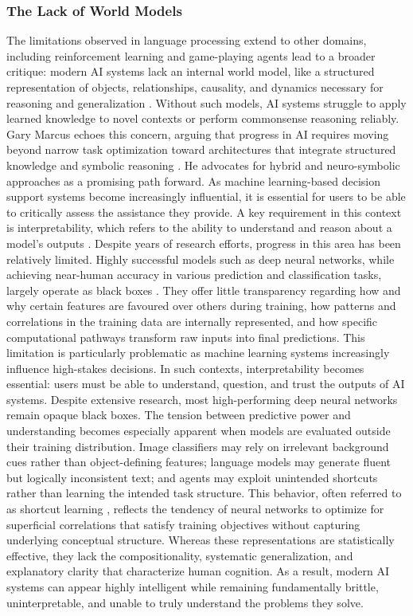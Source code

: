 \documentclass[12pt,a4paper]{report}
\begin{document}
\subsubsection{The Lack of World Models}
The limitations observed in language processing extend to other domains, including reinforcement learning and game-playing agents lead to a broader critique: modern AI systems lack an internal world model, like a structured representation of objects, relationships, causality, and dynamics necessary for reasoning and generalization \cite{chiave47} . Without such models, AI systems struggle to apply learned knowledge to novel contexts or perform commonsense reasoning reliably. Gary Marcus echoes this concern, arguing that progress in AI requires moving beyond narrow task optimization toward architectures that integrate structured knowledge and symbolic reasoning \cite{chiave42} . He advocates for hybrid and neuro-symbolic approaches as a promising path forward.
As machine learning-based decision support systems become increasingly influential, it is essential for users to be able to critically assess the assistance they provide. A key requirement in this context is interpretability, which refers to the ability to understand and reason about a model's outputs \cite{chiave25}. Despite years of research efforts, progress in this area has been relatively limited. Highly successful models such as deep neural networks, while achieving near-human accuracy in various prediction and classification tasks, largely operate as black boxes \cite{chiave7}. They offer little transparency regarding how and why certain features are favoured over others during training, how patterns and correlations in the training data are internally represented, and how specific computational pathways transform raw inputs into final predictions.
This limitation is particularly problematic as machine learning systems increasingly influence high-stakes decisions. In such contexts, interpretability becomes essential: users must be able to understand, question, and trust the outputs of AI systems. Despite extensive research, most high-performing deep neural networks remain opaque black boxes. 
The tension between predictive power and understanding becomes especially apparent when models are evaluated outside their training distribution. Image classifiers may rely on irrelevant background cues rather than object-defining features; language models may generate fluent but logically inconsistent text; and agents may exploit unintended shortcuts rather than learning the intended task structure. This behavior, often referred to as shortcut learning \cite{chiave17}, reflects the tendency of neural networks to optimize for superficial correlations that satisfy training objectives without capturing underlying conceptual structure.
Whereas these representations are statistically effective, they lack the compositionality, systematic generalization, and explanatory clarity that characterize human cognition. As a result, modern AI systems can appear highly intelligent while remaining fundamentally brittle, uninterpretable, and unable to truly understand the problems they solve.
\end{document}
